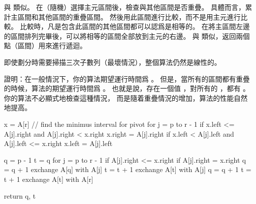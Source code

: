 \startANSWER
與 類似。
在（隨機）選擇主元區間後，檢查與其他區間是否重疊。
具體而言，累計主區間和其他區間的重疊區間。
然後用此區間進行比較，而不是用主元進行比較。
比較時，凡是包含此區間的其他區間都可以認爲是相等的。
在將主區間左邊的區間排列完畢後，可以將相等的區間全部放到主元的右邊。
與 類似，返回兩個點（區間）用來進行遞迴。

即使劃分時需要掃描三次子數列（最壞情況），整個算法仍然是線性的。
\stopANSWER

\startitem
證明：在一般情況下，你的算法期望運行時間爲 。
但是，當所有的區間都有重疊的時候，算法的期望運行時間爲 。
也就是說，存在一個值 ，對所有的 ，都有 。
你的算法不必顯式地檢查這種情況，
而是隨着重疊情況的增加，算法的性能自然地提高。
\stopitem

\startANSWER
{}
\startCLRS
x = A[r]
// find the minimus interval for pivot
for j = p to r - 1
	if x.left <= A[j].right and A[j].right < x.right
		x.right = A[j].right
	if x.left < A[j].left and A[j].left <= x.right
		x.left = A[j].left

q = p - 1
t = q
for j = p to r - 1
	if A[j].right <= x.right
		if A[j].right = x.right
			q = q + 1
			exchange A[q] with A[j]
		t = t + 1
		exchange A[t] with A[j]
q = q + 1
t = t + 1
exchange A[t] with A[r]

return q, t
\stopCLRS
\stopANSWER
\stopigBase
\stopPROBLEM

\stopsubject

